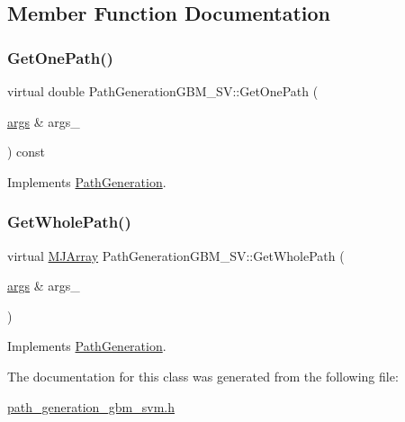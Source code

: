 \subsection{Member Function Documentation}
\hypertarget{classPathGenerationGBM__SV_a9db1428d6599489d22b2fa843c56fc31}{}\label{classPathGenerationGBM__SV_a9db1428d6599489d22b2fa843c56fc31} 
\subsubsection{\texorpdfstring{Get\+One\+Path()}{GetOnePath()}}
{\footnotesize\ttfamily virtual double Path\+Generation\+G\+B\+M\+\_\+\+S\+V\+::\+Get\+One\+Path (\begin{DoxyParamCaption}\item[{\hyperlink{path__generation_8h_a75c13cde2074f502cc4348c70528572d}{args} \&}]{args\+\_\+ }\end{DoxyParamCaption}) const\hspace{0.3cm}{\ttfamily [virtual]}}



Implements \hyperlink{classPathGeneration_a9a64a37f4dd9b2b3ef84f3cb66aed843}{Path\+Generation}.

\hypertarget{classPathGenerationGBM__SV_abb36f42991ec304d6efeaf772b8367c1}{}\label{classPathGenerationGBM__SV_abb36f42991ec304d6efeaf772b8367c1} 
\subsubsection{\texorpdfstring{Get\+Whole\+Path()}{GetWholePath()}}
{\footnotesize\ttfamily virtual \hyperlink{classMJArray}{M\+J\+Array} Path\+Generation\+G\+B\+M\+\_\+\+S\+V\+::\+Get\+Whole\+Path (\begin{DoxyParamCaption}\item[{\hyperlink{path__generation_8h_a75c13cde2074f502cc4348c70528572d}{args} \&}]{args\+\_\+ }\end{DoxyParamCaption})\hspace{0.3cm}{\ttfamily [virtual]}}



Implements \hyperlink{classPathGeneration_ace7520fed7b6a7711f4d3684c974cb76}{Path\+Generation}.



The documentation for this class was generated from the following file\+:\begin{DoxyCompactItemize}
\item 
\hyperlink{path__generation__gbm__svm_8h}{path\+\_\+generation\+\_\+gbm\+\_\+svm.\+h}\end{DoxyCompactItemize}
